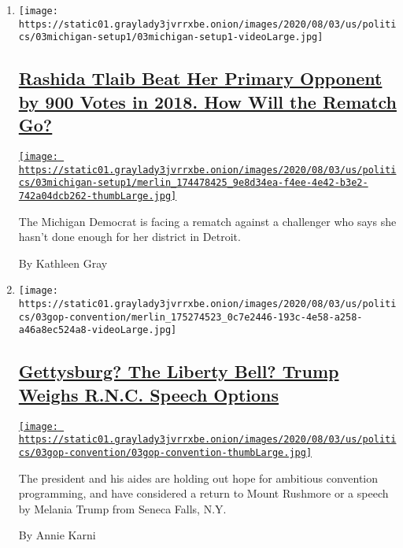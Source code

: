 \begin{enumerate}
\def\labelenumi{\arabic{enumi}.}
\item
  \texttt{[image: https://static01.graylady3jvrrxbe.onion/images/2020/08/03/us/politics/03michigan-setup1/03michigan-setup1-videoLarge.jpg]}

  \hypertarget{rashida-tlaib-beat-her-primary-opponent-by-900-votes-in-2018-how-will-the-rematch-go}{%
  \subsection{\texorpdfstring{\href{/2020/08/03/us/politics/michigan-primary-rashida-tlaib-brenda-jones.html}{Rashida
  Tlaib Beat Her Primary Opponent by 900 Votes in 2018. How Will the
  Rematch
  Go?}}{Rashida Tlaib Beat Her Primary Opponent by 900 Votes in 2018. How Will the Rematch Go?}}\label{rashida-tlaib-beat-her-primary-opponent-by-900-votes-in-2018-how-will-the-rematch-go}}

  \href{/2020/08/03/us/politics/michigan-primary-rashida-tlaib-brenda-jones.html}{\texttt{[image: https://static01.graylady3jvrrxbe.onion/images/2020/08/03/us/politics/03michigan-setup1/merlin\_174478425\_9e8d34ea-f4ee-4e42-b3e2-742a04dcb262-thumbLarge.jpg]}}

  The Michigan Democrat is facing a rematch against a challenger who
  says she hasn't done enough for her district in Detroit.

  By Kathleen Gray
\item
  \texttt{[image: https://static01.graylady3jvrrxbe.onion/images/2020/08/03/us/politics/03gop-convention/merlin\_175274523\_0c7e2446-193c-4e58-a258-a46a8ec524a8-videoLarge.jpg]}

  \hypertarget{gettysburg-the-liberty-bell-trump-weighs-rnc-speech-options}{%
  \subsection{\texorpdfstring{\href{/2020/08/03/us/politics/trump-rnc-speech.html}{Gettysburg?
  The Liberty Bell? Trump Weighs R.N.C. Speech
  Options}}{Gettysburg? The Liberty Bell? Trump Weighs R.N.C. Speech Options}}\label{gettysburg-the-liberty-bell-trump-weighs-rnc-speech-options}}

  \href{/2020/08/03/us/politics/trump-rnc-speech.html}{\texttt{[image: https://static01.graylady3jvrrxbe.onion/images/2020/08/03/us/politics/03gop-convention/03gop-convention-thumbLarge.jpg]}}

  The president and his aides are holding out hope for ambitious
  convention programming, and have considered a return to Mount Rushmore
  or a speech by Melania Trump from Seneca Falls, N.Y.

  By Annie Karni
\end{enumerate}

